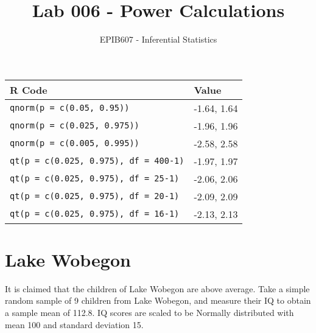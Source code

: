 \documentclass[letterpaper,11pt,twoside,]{pinp}
\title{Lab 006 - Power Calculations}
\author[a]{EPIB607 - Inferential Statistics}
\affil[a]{McGill University}
\begin{document}
\verticaladjustment{-2pt}

\maketitle
\thispagestyle{firststyle}



\begin{longtable}[]{@{}ll@{}}
\toprule
R Code & Value \\
\midrule
\endhead
\texttt{qnorm(p\ =\ c(0.05,\ 0.95))} & -1.64, 1.64 \\
\texttt{qnorm(p\ =\ c(0.025,\ 0.975))} & -1.96, 1.96 \\
\texttt{qnorm(p\ =\ c(0.005,\ 0.995))} & -2.58, 2.58 \\
\texttt{qt(p\ =\ c(0.025,\ 0.975),\ df\ =\ 400-1)} & -1.97, 1.97 \\
\texttt{qt(p\ =\ c(0.025,\ 0.975),\ df\ =\ 25-1)} & -2.06, 2.06 \\
\texttt{qt(p\ =\ c(0.025,\ 0.975),\ df\ =\ 20-1)} & -2.09, 2.09 \\
\texttt{qt(p\ =\ c(0.025,\ 0.975),\ df\ =\ 16-1)} & -2.13, 2.13 \\
\bottomrule
\end{longtable}

\hypertarget{lake-wobegon}{%
\section{Lake Wobegon}\label{lake-wobegon}}

It is claimed that the children of Lake Wobegon are above average. Take
a simple random sample of 9 children from Lake Wobegon, and measure
their IQ to obtain a sample mean of 112.8. IQ scores are scaled to be
Normally distributed with mean 100 and standard deviation 15.
\end{document}
